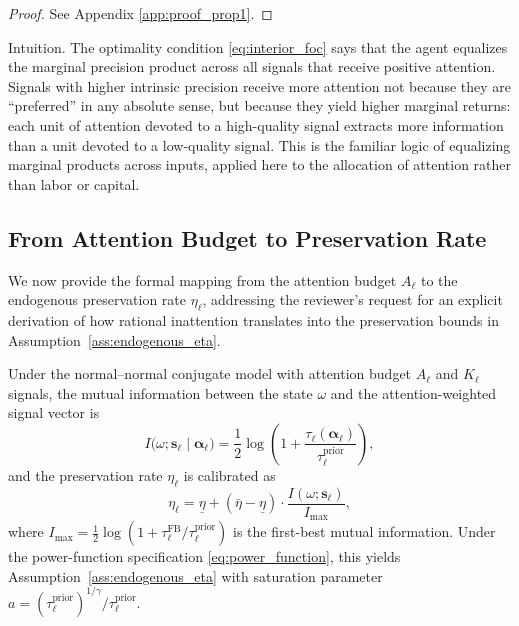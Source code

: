 \begin{proof}
See Appendix \ref{app:proof_prop1}.
\end{proof}

Intuition. The optimality condition \eqref{eq:interior_foc} says that the agent equalizes the marginal precision product across all signals that receive positive attention. Signals with higher intrinsic precision receive more attention not because they are ``preferred'' in any absolute sense, but because they yield higher marginal returns: each unit of attention devoted to a high-quality signal extracts more information than a unit devoted to a low-quality signal. This is the familiar logic of equalizing marginal products across inputs, applied here to the allocation of attention rather than labor or capital.

\subsection{From Attention Budget to Preservation Rate}
\label{subsec:ri_to_eta}

We now provide the formal mapping from the attention budget $A_\ell$ to the endogenous preservation rate $\eta_\ell$, addressing the reviewer's request for an explicit derivation of how rational inattention translates into the preservation bounds in Assumption~\ref{ass:endogenous_eta}.

\begin{proposition}\label{prop:ri_to_eta}
Under the normal--normal conjugate model with attention budget $A_\ell$ and $K_\ell$ signals, the mutual information between the state $\omega$ and the attention-weighted signal vector is
\begin{equation}\label{eq:mutual_info}
I\bigl(\omega; \mathbf{s}_\ell \mid \boldsymbol{\alpha}_\ell\bigr) = \frac{1}{2} \log\left(1 + \frac{\tau_\ell(\boldsymbol{\alpha}_\ell)}{\tau^{\text{prior}}_\ell}\right),
\end{equation}
and the preservation rate $\eta_\ell$ is calibrated as
\begin{equation}\label{eq:eta_calibration}
\eta_\ell = \underline{\eta} + (\bar{\eta} - \underline{\eta}) \cdot \frac{I(\omega; \mathbf{s}_\ell)}{I_{\max}},
\end{equation}
where $I_{\max} = \frac{1}{2}\log(1 + \tau^{\text{FB}}_\ell / \tau^{\text{prior}}_\ell)$ is the first-best mutual information. Under the power-function specification \eqref{eq:power_function}, this yields Assumption~\ref{ass:endogenous_eta} with saturation parameter $a = (\tau^{\text{prior}}_\ell)^{1/\gamma} / \tau^{\text{prior}}_\ell$.
\end{proposition}

